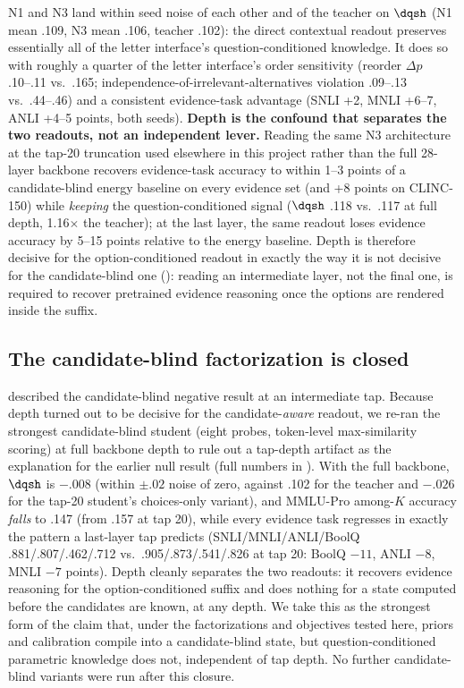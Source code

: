 N1 and N3 land within seed noise of each other and of the teacher on $\dqsh$ (N1 mean .109, N3 mean .106,
teacher .102): the direct contextual readout preserves essentially all of the letter interface's
question-conditioned knowledge. It does so with roughly a quarter of the letter interface's order
sensitivity (reorder $\Delta p$ .10--.11 vs.\ .165; independence-of-irrelevant-alternatives violation .09--.13
vs.\ .44--.46) and a consistent evidence-task advantage (SNLI +2, MNLI +6--7, ANLI +4--5 points, both
seeds). \textbf{Depth is the confound that separates the two readouts, not an independent lever.} Reading
the same N3 architecture at the tap-20 truncation used elsewhere in this project rather than the full
28-layer backbone recovers evidence-task accuracy to within 1--3 points of a candidate-blind energy
baseline on every evidence set (and +8 points on CLINC-150) while \emph{keeping} the question-conditioned
signal ($\dqsh$ .118 vs.\ .117 at full depth, 1.16$\times$ the teacher); at the last layer, the same readout
loses evidence accuracy by 5--15 points relative to the energy baseline. Depth is therefore decisive for the
option-conditioned readout in exactly the way it is not decisive for the candidate-blind one
(): reading an intermediate layer, not the final one, is required to
recover pretrained evidence reasoning once the options are rendered inside the suffix.

\subsection{The candidate-blind factorization is closed}
\label{sec:results:candidate-blind}

 described the candidate-blind negative result at an intermediate tap.
Because depth turned out to be decisive for the candidate-\emph{aware} readout, we re-ran the strongest
candidate-blind student (eight probes, token-level max-similarity scoring) at full backbone depth to rule
out a tap-depth artifact as the explanation for the earlier null result (full numbers in
). With the full backbone, $\dqsh$ is $-.008$ (within $\pm .02$ noise of
zero, against .102 for the teacher and $-.026$ for the tap-20 student's choices-only variant), and MMLU-Pro
among-$K$ accuracy \emph{falls} to .147 (from .157 at tap 20), while every evidence task regresses in
exactly the pattern a last-layer tap predicts (SNLI/MNLI/ANLI/BoolQ .881/.807/.462/.712 vs.\ .905/.873/.541/.826
at tap 20: BoolQ $-11$, ANLI $-8$, MNLI $-7$ points). Depth cleanly separates the two readouts: it recovers evidence reasoning for the option-conditioned suffix
and does nothing for a state computed before the candidates are known, at any depth. We take this as the
strongest form of the claim that, under the factorizations and objectives tested here, priors and
calibration compile into a candidate-blind state, but question-conditioned parametric knowledge does not,
independent of tap depth. No further candidate-blind variants were run after this closure.

